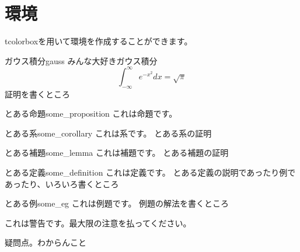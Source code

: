 \chapter{環境}
tcolorboxを用いて環境を作成することができます。
\begin{theorem}{ガウス積分}{gauss}
    みんな大好きガウス積分
    \begin{equation}
        \int_{-\infty}^{\infty} e^{-x^2} dx = \sqrt{\pi}
    \end{equation}
    \tcblower
    証明を書くところ
\end{theorem}

\begin{proposition}{とある命題}{some_proposition}
    これは命題です。
\end{proposition}

\begin{corollary}{とある系}{some_corollary}
    これは系です。
    \tcblower
    とある系の証明
\end{corollary}

\begin{lemma}{とある補題}{some_lemma}
    これは補題です。
    \tcblower
    とある補題の証明
\end{lemma}

\begin{definition}{とある定義}{some_definition}
    これは定義です。
    \tcblower
    とある定義の説明であったり例であったり、いろいろ書くところ
\end{definition}

\begin{eg}{とある例}{some_eg}
    これは例題です。
    \tcblower
    例題の解法を書くところ
\end{eg}


\begin{warning}
    これは警告です。最大限の注意を払ってください。
\end{warning}

\begin{question}
    疑問点。わからんこと
\end{question}